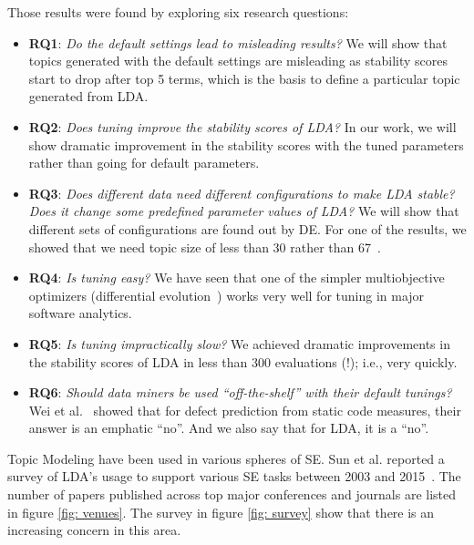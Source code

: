 \documentclass[conference]{IEEEtran}
\theoremstyle{break}
\begin{document}
Those results were found by exploring six research questions:
\begin{itemize}
    \item \textbf{RQ1}: \textit{Do the default settings lead to misleading results?} We will show that topics generated with the default settings are misleading as stability scores start to drop after top 5 terms, which is the basis to define a particular topic generated from LDA.
    \item \textbf{RQ2}: \textit{Does tuning improve the stability scores of LDA?} In our work, we will show dramatic improvement in the stability scores with the tuned parameters rather than going for default parameters.
    \item \textbf{RQ3}: \textit{Does different data need different configurations to make LDA stable? Does it change some predefined parameter values of LDA?} We will show that different sets of configurations are found out by DE. For one of the results, we showed that we need topic size of less than 30 rather than 67~\cite{garousi2016citations}.
    \item \textbf{RQ4}: \textit{Is tuning easy?} We have seen that one of the simpler multiobjective optimizers (differential evolution~\cite{storn1997differential}) works very well for tuning in major software analytics.
    \item \textbf{RQ5}: \textit{Is tuning impractically slow?} We achieved dramatic improvements in the stability scores of LDA in less than 300 evaluations (!); i.e., very quickly.
    \item \textbf{RQ6}: \textit{Should data miners be used “off-the-shelf” with their default tunings?} Wei et al.~\cite{fu2016tuning} showed that for defect prediction from static code measures, their answer is an emphatic “no”. And we also say that for LDA, it is a “no”. 
\end{itemize}

Topic Modeling have been used in various spheres of SE. Sun et al. reported a survey of LDA's usage to support various SE tasks between 2003 and 2015~\cite{sun2016exploring}. The number of papers published across top major conferences and journals are listed in figure \ref{fig: venues}. The survey in figure \ref{fig: survey} show that there is an increasing concern in this area.
\end{document}
